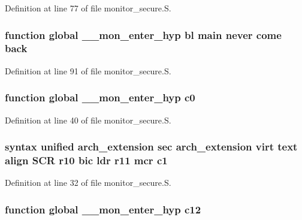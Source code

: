 \-Definition at line 77 of file monitor\-\_\-secure.\-S.

\hypertarget{monitor__secure_8_s_a0352f684605c42dc5f2fff2984dd68d3}{
\subsubsection[{back}]{\setlength{\rightskip}{0pt plus 5cm}function global {\bf \-\_\-\-\_\-mon\-\_\-enter\-\_\-hyp} bl main never come {\bf back}}}\label{monitor__secure_8_s_a0352f684605c42dc5f2fff2984dd68d3}


\-Definition at line 91 of file monitor\-\_\-secure.\-S.

\hypertarget{monitor__secure_8_s_ab27b8b5969509d6e2728aa7e458a4d9b}{
\subsubsection[{c0}]{\setlength{\rightskip}{0pt plus 5cm}function global {\bf \-\_\-\-\_\-mon\-\_\-enter\-\_\-hyp} {\bf c0}}}\label{monitor__secure_8_s_ab27b8b5969509d6e2728aa7e458a4d9b}


\-Definition at line 40 of file monitor\-\_\-secure.\-S.

\hypertarget{monitor__secure_8_s_ab6ea2e389efb51db2c662047a8c2d198}{
\subsubsection[{c1}]{\setlength{\rightskip}{0pt plus 5cm}syntax unified arch\-\_\-extension sec arch\-\_\-extension virt text align \-S\-C\-R {\bf r10} bic ldr {\bf r11} mcr {\bf c1}}}\label{monitor__secure_8_s_ab6ea2e389efb51db2c662047a8c2d198}


\-Definition at line 32 of file monitor\-\_\-secure.\-S.

\hypertarget{monitor__secure_8_s_ae1450584a05b000986bddb6b03665f0d}{
\subsubsection[{c12}]{\setlength{\rightskip}{0pt plus 5cm}function global {\bf \-\_\-\-\_\-mon\-\_\-enter\-\_\-hyp} {\bf c12}}}\label{monitor__secure_8_s_ae1450584a05b000986bddb6b03665f0d}


